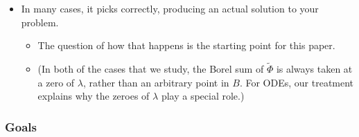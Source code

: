 \documentclass{article}
\begin{document}
\begin{itemize}
\item In many cases, it picks correctly, producing an actual solution to your problem.
\begin{itemize}
\item The question of how that happens is the starting point for this paper.
\item (In both of the cases that we study, the Borel sum of $\tilde{\Phi}$ is always taken at a zero of $\lambda$, rather than an arbitrary point in $B$. For ODEs, our treatment explains why the zeroes of $\lambda$ play a special role.)
\end{itemize}
\end{itemize}
\subsubsection{Goals}
\end{document}
